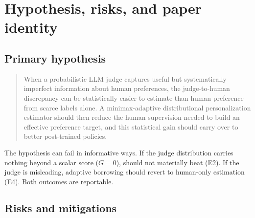 \section{Hypothesis, risks, and paper identity}
\label{sec:risks}

\subsection{Primary hypothesis}

\begin{quote}
When a probabilistic LLM judge captures useful but systematically imperfect information about human
preferences, the judge-to-human discrepancy can be statistically easier to estimate than human
preference from scarce labels alone. A minimax-adaptive distributional personalization estimator
should then reduce the human supervision needed to build an effective preference target, and this
statistical gain should carry over to better post-trained policies.
\end{quote}

The hypothesis can fail in informative ways. If the judge distribution carries nothing beyond a
scalar score ($G=0$), \dfsp{} should not materially beat \sfsp{} (E2). If the judge is misleading,
adaptive borrowing should revert to human-only estimation (E4). Both outcomes are reportable.

\subsection{Risks and mitigations}

